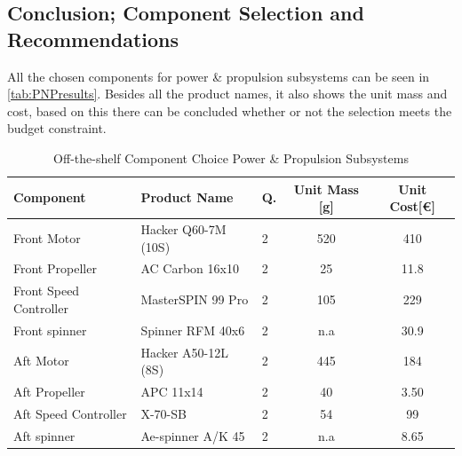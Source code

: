 {\subsection{Conclusion; Component Selection and Recommendations}
All the chosen components for power \& propulsion subsystems can be seen in \autoref{tab:PNPresults}. Besides all the product names, it also shows the unit mass and cost, based on this there can be concluded whether or not the selection meets the budget constraint.
\begin{table}[H]
\centering
\caption{Off-the-shelf Component Choice Power \& Propulsion Subsystems}
\label{tab:PNPresults}
    \begin{tabular}{m{4cm}m{4cm}m{0.6cm}cc}
    \toprule
    \bfseries Component                   &\bfseries Product Name                                                     &\bfseries Q. &\bfseries Unit Mass {[g]} &\bfseries Unit Cost{[\euro]} \\ \midrule
    Front Motor        & Hacker Q60-7M (10S)                                                             & 2           & 520                        & 410                      \\\hdashline
    Front Propeller    & AC Carbon 16x10                                                           & 2           & 25                         & 11.8                      \\\hdashline
    Front Speed Controller & MasterSPIN 99 Pro                                                         & 2           & 105                        & 229                      \\\hdashline
    Front spinner     & Spinner RFM 40x6                                                            & 2  & n.a & 30.9
                      \\\hdashline
    Aft Motor          & Hacker A50-12L (8S)                                                           & 2           & 445                        & 184                      \\\hdashline
    Aft Propeller      & APC 11x14                                                                 & 2           & 40                         & 3.50                       \\\hdashline
    Aft Speed Controller   & X-70-SB                                                                   & 2           & 54                         & 99                       \\\hdashline
    Aft spinner        & Ae-spinner A/K 45                                                      &  2        & n.a & 8.65

\end{tabular}
\end{table}}
